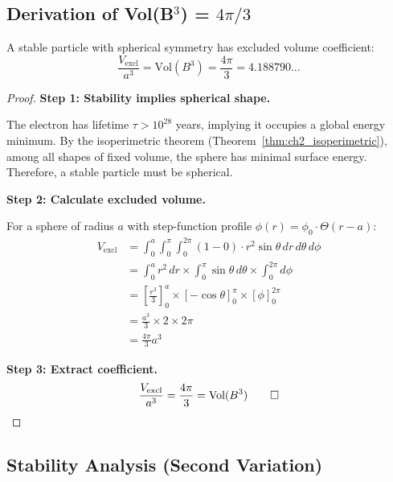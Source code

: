 \subsection{Derivation of Vol(B$^3$) = $4\pi/3$}

\begin{theorem}
\label{thm:ch2_electron}
\tagDc{}
A stable particle with spherical symmetry has excluded volume coefficient:
\begin{equation}
\frac{V_{\text{excl}}}{a^3} = \text{Vol}(B^3) = \frac{4\pi}{3} = 4.188790...
\label{eq:ch2_vol_b3}
\end{equation}
\end{theorem}

\begin{proof}
\textbf{Step 1: Stability implies spherical shape.}

The electron has lifetime $\tau > 10^{28}$ years, implying it occupies a global energy
minimum. By the isoperimetric theorem (Theorem~\ref{thm:ch2_isoperimetric}), among all
shapes of fixed volume, the sphere has minimal surface energy. Therefore, a stable
particle must be spherical.

\textbf{Step 2: Calculate excluded volume.}

For a sphere of radius $a$ with step-function profile $\phi(r) = \phi_0 \cdot \Theta(r-a)$:
\begin{align}
V_{\text{excl}} &= \int_0^a \int_0^\pi \int_0^{2\pi} \left(1 - 0\right) \cdot r^2 \sin\theta \, dr\, d\theta\, d\phi \\
&= \int_0^a r^2 \, dr \times \int_0^\pi \sin\theta \, d\theta \times \int_0^{2\pi} d\phi \\
&= \left[\frac{r^3}{3}\right]_0^a \times \left[-\cos\theta\right]_0^\pi \times \left[\phi\right]_0^{2\pi} \\
&= \frac{a^3}{3} \times 2 \times 2\pi \\
&= \frac{4\pi}{3} a^3
\label{eq:ch2_vol_calculation}
\end{align}

\textbf{Step 3: Extract coefficient.}
\begin{equation}
\frac{V_{\text{excl}}}{a^3} = \frac{4\pi}{3} = \text{Vol}(B^3) \qed
\label{eq:ch2_vol_coefficient}
\end{equation}
\end{proof}

\subsection{Stability Analysis (Second Variation)}

